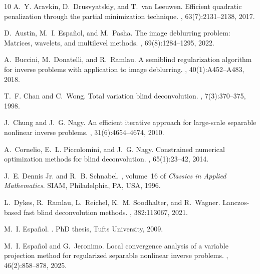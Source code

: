 \documentclass[onefignum,onetabnum]{siamart171218}
\begin{document}
\begin{thebibliography}{10}
A.~Y. Aravkin, D.~Drusvyatskiy, and T.~van Leeuwen.
\newblock Efficient quadratic penalization through the partial minimization
  technique.
, 63(7):2131--2138, 2017.

D.~Austin, M.~I. Espa{\~n}ol, and M.~Pasha.
\newblock The image deblurring problem: Matrices, wavelets, and multilevel
  methods.
, 69(8):1284--1295,
  2022.

A.~Buccini, M.~Donatelli, and R.~Ramlau.
\newblock A semiblind regularization algorithm for inverse problems with
  application to image deblurring.
, 40(1):A452--A483, 2018.

T.~F. Chan and C.~Wong.
\newblock Total variation blind deconvolution.
, 7(3):370--375, 1998.

J.~Chung and J.~G. Nagy.
\newblock An efficient iterative approach for large-scale separable nonlinear
  inverse problems.
, 31(6):4654--4674, 2010.

A.~Cornelio, E.~L. Piccolomini, and J.~G. Nagy.
\newblock Constrained numerical optimization methods for blind deconvolution.
, 65(1):23--42, 2014.

J.~E. {Dennis Jr.} and R.~B. Schnabel.
, volume~16 of {\em Classics in Applied Mathematics}.
\newblock SIAM, Philadelphia, PA, USA, 1996.

L.~Dykes, R.~Ramlau, L.~Reichel, K.~M. Soodhalter, and R.~Wagner.
\newblock Lanczos-based fast blind deconvolution methods.
, 382:113067,
  2021.

M.~I. Espa{\~n}ol.
.
\newblock PhD thesis, Tufts University, 2009.

M.~I. Espa{\~n}ol and G.~Jeronimo.
\newblock Local convergence analysis of a variable projection method for
  regularized separable nonlinear inverse problems.
,
  46(2):858--878, 2025.


\end{thebibliography}
\end{document}
